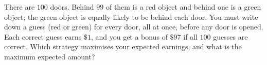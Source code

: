 There are $100$ doors. Behind $99$ of them is a red object and behind one is a green object; the green object is equally likely to be behind each door. You must write down a guess (red or green) for every door, all at once, before any door is opened. Each correct guess earns $\$1$, and you get a bonus of $\$97$ if all $100$ guesses are correct. Which strategy maximises your expected earnings, and what is the maximum expected amount?
